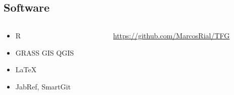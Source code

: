 \documentclass[12pt]{beamer}
\begin{document}
\subsection{Software}
\begin{frame}
	\begin{columns}
		\begin{column}{3.5cm} \vspace*{0.2cm}
			\begin{block}{}
				\begin{itemize}[<+->]
					\item R
					\item GRASS GIS QGIS
					\item \LaTeX
					\item JabRef, SmartGit
				\end{itemize}
			\end{block}
		\end{column}
		\begin{column}{7cm}
			\begin{block}{}
			\only<4> {\small	\url{https://github.com/MarcosRial/TFG}}
			\end{block}
		\end{column}
	\end{columns}
\end{frame}
\end{document}
